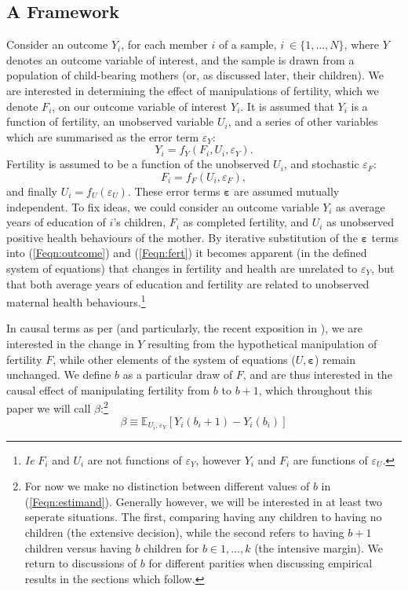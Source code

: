\subsection{A Framework}
Consider an outcome $Y_i$, for each member $i$ of a sample, $i\ \in \{1,\ldots,
N\}$, where $Y$ denotes an outcome variable of interest, and the sample is drawn
from a population of child-bearing mothers (or, as discussed later, their 
children). We are 
interested in determining the effect of manipulations of fertility, which we
denote $F_i$, on our outcome variable of interest $Y_i$.  It is assumed that 
$Y_i$ is a function of fertility, an unobserved variable $U_i$, and a series of 
other variables which are summarised as the error term $\varepsilon_Y$:
\begin{equation}
\label{Feqn:outcome}
Y_i=f_Y(F_i,U_i,\varepsilon_Y).
\end{equation}
Fertility is assumed to be a function of the unobserved $U_i$, and stochastic 
$\varepsilon_F$:
\begin{equation}
\label{Feqn:fert}
F_i=f_F(U_i,\varepsilon_F),
\end{equation}
and finally $U_i=f_U(\varepsilon_U)$. These error terms $\bm\varepsilon$ are 
assumed mutually independent. To fix ideas, we could consider an outcome variable 
$Y_i$ as average years of education of $i$'s children, $F_i$ as completed 
fertility, and $U_i$ as unobserved positive health behaviours of the mother. By 
iterative substitution of the $\bm\varepsilon$ terms into (\ref{Feqn:outcome}) 
and (\ref{Feqn:fert}) it becomes apparent (in the defined system of equations) 
that changes in fertility and health are unrelated to $\varepsilon_Y$, but that 
both average years of education and fertility are related to unobserved maternal 
health behaviours.\footnote{\emph{Ie} $F_i$ and $U_i$ are not functions of 
$\varepsilon_Y$, however $Y_i$ and $F_i$ are functions of $\varepsilon_U$.}

In causal terms as per \citet{Haavelmo1943,Haavelmo1944} (and particularly, the
recent exposition in \citet{HeckmanPinto2015}), we are interested in the change
in $Y$ resulting from the hypothetical manipulation of fertility $F$, while 
other elements of the system of equations ($U,\bm\varepsilon$) remain unchanged.  
We define $b$ as a particular draw of $F$, and are thus interested in the causal 
effect of manipulating fertility from $b$ to $b+1$, which throughout this paper
we will call $\beta$:\footnote{For now we make no distinction between different 
values of $b$ in (\ref{Feqn:estimand}).  Generally however, we will be interested 
in at least two seperate situations. The first, comparing having any children 
to having no children (the extensive decision), while the second refers to 
having $b+1$ children versus having $b$ children for $b\in{1,\ldots,k}$ (the 
intensive margin).  We return to discussions of $b$ for different parities when
discussing empirical results in the sections which follow.}
\begin{equation}
\label{Feqn:estimand}
\beta\equiv\mathbb{E}_{U_i,\varepsilon_Y}[Y_i(b_i+1)-Y_i(b_i)]
\end{equation}

